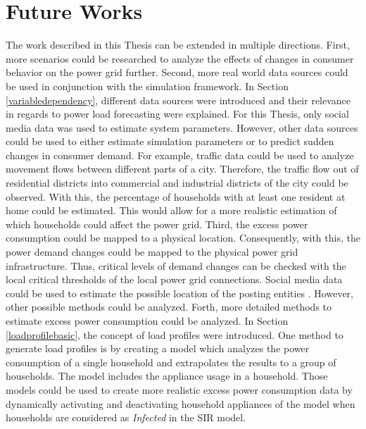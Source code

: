 \section{Future Works}

The work described in this Thesis can be extended in multiple
directions. First, more scenarios could be researched 
to analyze the effects of changes in consumer behavior
on the power grid further. Second, more real world 
data sources could be used in conjunction with the 
simulation framework.
In Section \ref{variabledependency}, different data 
sources were introduced and their relevance in regards 
to power load forecasting were explained. For this
Thesis, only social media data was used to estimate system 
parameters. However, other data sources could be used
to either estimate simulation parameters or to predict
sudden changes in consumer demand. For example,
traffic data could be used to analyze movement flows 
between different parts of a city. Therefore, the
traffic flow out of residential districts into 
commercial and industrial districts of the city 
could be observed. With this,
the percentage of households with at least one 
resident at home could be estimated. 
This would allow for a more realistic estimation 
of which households could affect the power grid.
Third, the excess power consumption could be mapped
to a physical location. Consequently, with this, 
the power demand changes could be mapped to the 
physical power grid infrastructure. Thus, 
critical levels of demand changes can be 
checked with the local critical thresholds of the
local power grid connections. Social media data could
be used to estimate the possible location of the 
posting entities \cite{jurgens2015geolocation}.
However, other possible methods could be analyzed.
Forth, more detailed methods to estimate excess 
power consumption could be analyzed.
In Section \ref{loadprofilebasic}, the concept 
of load profiles were introduced. One 
method to generate load profiles is by 
creating a model which 
analyzes the power consumption of a single 
household and extrapolates the results to 
a group of households. The model includes 
the appliance usage in a household. 
Those models could be used to create more 
realistic excess power consumption data
by dynamically activating and deactivating
household appliances of the model when 
households are considered as 
\textit{Infected} in the SIR model.




